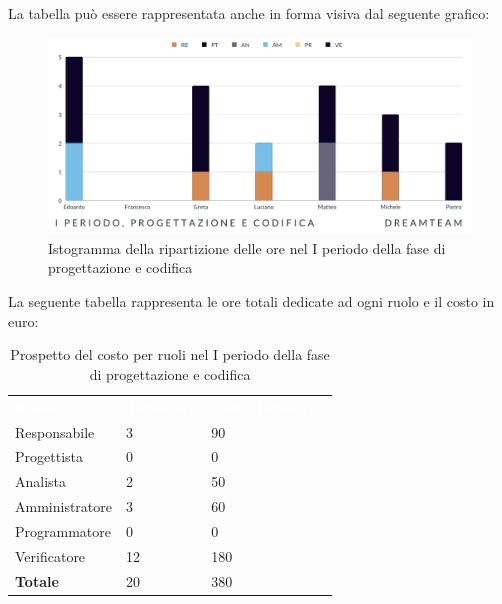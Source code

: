 La tabella può essere rappresentata anche in forma visiva dal seguente grafico:
\begin{figure}[!h]
\centering
\includegraphics[scale=0.65]{Sezioni/SezioniPreventivo/grafici/Progettazione_codifica_I_periodo.png}
\caption{Istogramma della ripartizione delle ore nel I periodo della fase di progettazione e codifica}
\end{figure}

La seguente tabella rappresenta le ore totali dedicate ad ogni ruolo e il costo in euro:

\begin{table}[!htbp]
\begin{center}
\renewcommand{\arraystretch}{1.5}
\begin{tabular}{ m{}<{\centering}  m{}<{\centering} m{}<{\centering}}
	\rowcolor{darkblue}
	\textcolor{white}{\textbf{Ruolo}}&\textcolor{white}{\textbf{Totale ore}}&\textcolor{white}{\textbf{Costo totale (\euro)}}\\ 

	Responsabile  & 3 & 90 \\	
	
	Progettista & 0 & 0 \\
	
	Analista & 2 & 50 \\

	Amministratore & 3 & 60 \\
	
	Programmatore & 0 & 0 \\
	
	Verificatore & 12 & 180 \\
	
	\textbf{Totale} & 20 & 380 \\
	
\end{tabular}
\caption{Prospetto del costo per ruoli nel I periodo della fase di progettazione e codifica}
\end{center}
\end{table}

